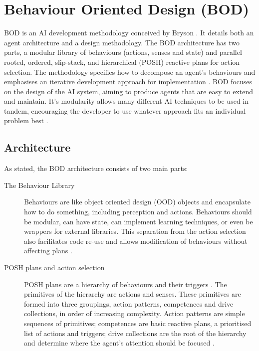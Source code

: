 \documentclass[11pt,openright,a4paper]{report}
\begin{document}
\section{Behaviour Oriented Design (BOD)}
BOD is an AI development methodology conceived by Bryson \cite{bryson2001intelligence}. It details both an agent architecture and a design methodology.  The BOD architecture has two parts, a modular library of behaviours (actions, senses and state) and parallel rooted, ordered, slip-stack,  and hierarchical (POSH) reactive plans for action selection. The methodology specifies how to decompose an agent's behaviours and emphasises an iterative development approach for implementation \cite{bryson2003behavior}. BOD focuses on the design of the AI system, aiming to produce agents that are easy to extend and maintain. It's modularity allows many different AI techniques to be used in tandem, encouraging the developer to use whatever approach fits an individual problem best \cite{gaudlbehaviour}.

\subsection{Architecture}
As stated,  the BOD architecture consists of two main parts:
\begin{description}
\item[The Behaviour Library] Behaviours are like object oriented design (OOD) objects and encapsulate how to do something, including perception and actions. Behaviours should be modular, can have state, can implement learning techniques, or even be wrappers for external libraries. This separation from the action selection also facilitates code re-use and allows modification of behaviours without affecting plans \cite{gaudlbehaviour}.
\item[POSH plans and action selection] POSH plans are a hierarchy of behaviours and their triggers \cite{gaudlbehaviour}. The primitives of the hierarchy are actions and senses. These primitives are formed into three groupings, action patterns, competences and drive collections, in order of increasing complexity. Action patterns are simple sequences of primitives; competences are basic reactive plans, a prioritised list of actions and triggers; drive collections are the root of the hierarchy and determine where the agent's attention should be focused \cite{bryson2003behavior}.
\end{description}
\end{document}
